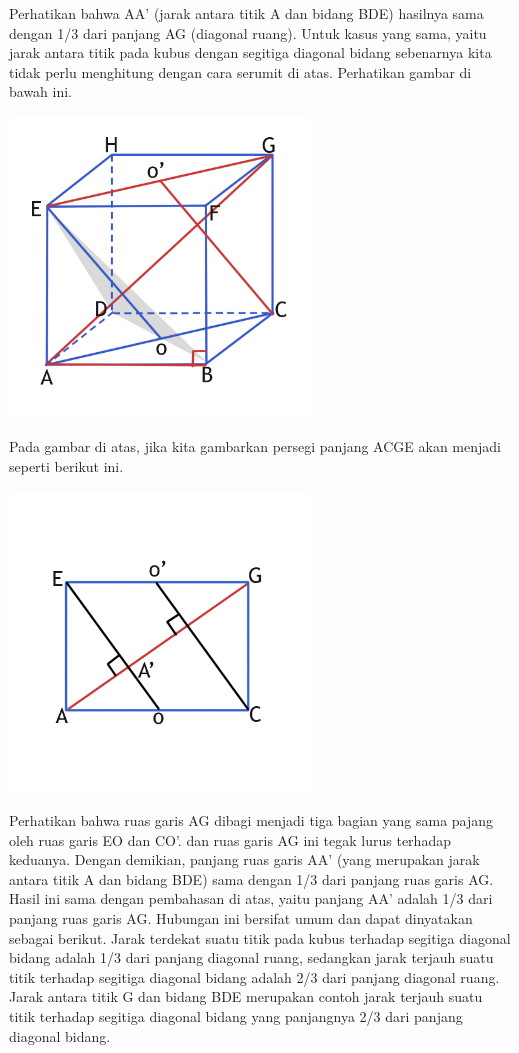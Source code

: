 \documentclass[11pt,fleqn]{book} %
\begin{document}
 
	Perhatikan bahwa AA' (jarak antara titik A dan bidang BDE) hasilnya sama dengan 1/3 dari panjang AG (diagonal ruang). Untuk kasus yang sama, yaitu jarak antara titik pada kubus dengan segitiga diagonal bidang sebenarnya kita tidak perlu menghitung dengan cara serumit di atas. Perhatikan gambar di bawah ini.

\includegraphics[width = 8cm, height= 8cm]{Pictures/dede7.jpg}

	Pada gambar di atas, jika kita gambarkan persegi panjang ACGE akan menjadi seperti berikut ini.


\includegraphics[width = 8cm, height= 8cm]{Pictures/dede8.jpg}

	Perhatikan bahwa ruas garis AG dibagi menjadi tiga bagian yang sama pajang oleh ruas garis EO dan CO'. dan ruas garis AG ini tegak lurus terhadap keduanya. Dengan demikian, panjang ruas garis AA' (yang merupakan jarak antara titik A dan bidang BDE) sama dengan 1/3 dari panjang ruas garis AG. Hasil ini sama dengan pembahasan di atas, yaitu panjang AA' adalah 1/3 dari panjang ruas garis AG. Hubungan ini bersifat umum dan dapat dinyatakan sebagai berikut.
	Jarak terdekat suatu titik pada kubus terhadap segitiga diagonal bidang adalah 1/3 dari panjang diagonal ruang, sedangkan jarak terjauh suatu titik terhadap segitiga diagonal bidang adalah 2/3 dari panjang diagonal ruang.
	Jarak antara titik G dan bidang BDE merupakan contoh jarak terjauh suatu titik terhadap segitiga diagonal bidang yang panjangnya 2/3 dari panjang diagonal bidang.
	
\end{document}
